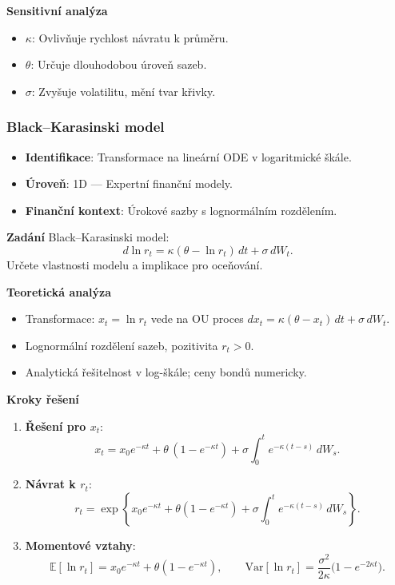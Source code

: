 \begin{example}
\noindent\textbf{Sensitivní analýza}
\begin{itemize}
\item \textbf{$\kappa$}: Ovlivňuje rychlost návratu k průměru.
\item \textbf{$\theta$}: Určuje dlouhodobou úroveň sazeb.
\item \textbf{$\sigma$}: Zvyšuje volatilitu, mění tvar křivky.
\end{itemize}
\end{example}

\subsubsection{Black–Karasinski model}
\label{subsec:black-karasinski-model}

\begin{example}
\label{ex:black-karasinski-model}

\begin{itemize}
\item \textbf{Identifikace}: Transformace na lineární ODE v logaritmické škále.
\item \textbf{Úroveň}: 1D — Expertní finanční modely.
\item \textbf{Finanční kontext}: Úrokové sazby s lognormálním rozdělením.
\end{itemize}

\noindent\textbf{Zadání}
Black–Karasinski model:
\[
d\ln r_t = \kappa(\theta - \ln r_t)\, dt + \sigma\, dW_t.
\]
Určete vlastnosti modelu a implikace pro oceňování.

\noindent\textbf{Teoretická analýza}
\begin{itemize}
\item Transformace: $x_t=\ln r_t$ vede na OU proces
\(
dx_t = \kappa(\theta - x_t)\, dt + \sigma\, dW_t.
\)
\item Lognormální rozdělení sazeb, pozitivita $r_t>0$.
\item Analytická řešitelnost v log-škále; ceny bondů numericky.
\end{itemize}

\noindent\textbf{Kroky řešení}
\begin{enumerate}
\item \textbf{Řešení pro $x_t$}:
\[
x_t = x_0 e^{-\kappa t} + \theta\,(1-e^{-\kappa t}) + 
\sigma \int_0^t e^{-\kappa (t-s)}\, dW_s.
\]
\item \textbf{Návrat k $r_t$}:
\[
r_t = \exp\!\left\{x_0 e^{-\kappa t} + \theta(1-e^{-\kappa t}) + 
\sigma \int_0^t e^{-\kappa (t-s)}\, dW_s\right\}.
\]
\item \textbf{Momentové vztahy}:
\[
\mathbb{E}[\ln r_t] = x_0 e^{-\kappa t} + \theta(1-e^{-\kappa t}),\qquad
\mathrm{Var}[\ln r_t] = \frac{\sigma^2}{2\kappa}\big(1-e^{-2\kappa t}\big).
\]
\end{enumerate}


\end{example}
